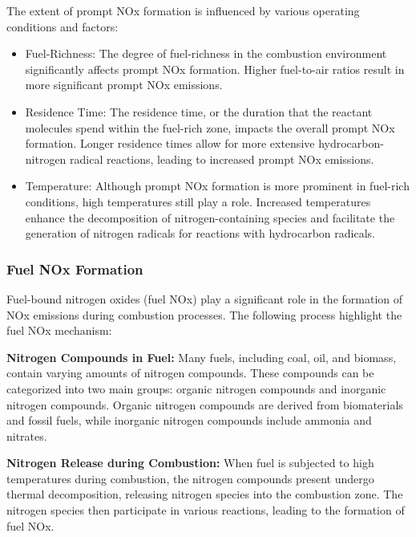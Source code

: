The extent of prompt NOx formation is influenced by various operating conditions and factors:
\begin{itemize}
    \item Fuel-Richness: The degree of fuel-richness in the combustion environment significantly affects prompt NOx formation. Higher fuel-to-air ratios result in more significant prompt NOx emissions.
    \item Residence Time: The residence time, or the duration that the reactant molecules spend within the fuel-rich zone, impacts the overall prompt NOx formation. Longer residence times allow for more extensive hydrocarbon-nitrogen radical reactions, leading to increased prompt NOx emissions.
    \item Temperature: Although prompt NOx formation is more prominent in fuel-rich conditions, high temperatures still play a role. Increased temperatures enhance the decomposition of nitrogen-containing species and facilitate the generation of nitrogen radicals for reactions with hydrocarbon radicals.
\end{itemize}

\subsubsection{Fuel NOx Formation}
Fuel-bound nitrogen oxides (fuel NOx) play a significant role in the formation of NOx emissions during combustion processes. The following process highlight the fuel NOx mechanism:

\textbf{Nitrogen Compounds in Fuel:}
Many fuels, including coal, oil, and biomass, contain varying amounts of nitrogen compounds. These compounds can be categorized into two main groups: organic nitrogen compounds and inorganic nitrogen compounds. Organic nitrogen compounds are derived from biomaterials and fossil fuels, while inorganic nitrogen compounds include ammonia and nitrates.

\textbf{Nitrogen Release during Combustion:}
When fuel is subjected to high temperatures during combustion, the nitrogen compounds present undergo thermal decomposition, releasing nitrogen species into the combustion zone. The nitrogen species then participate in various reactions, leading to the formation of fuel NOx. 

